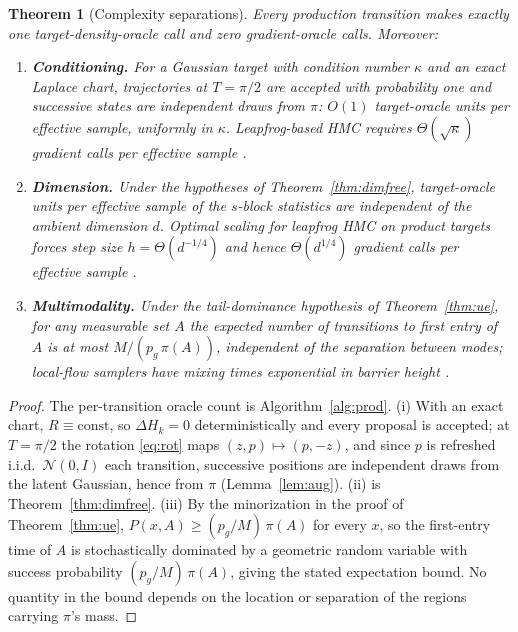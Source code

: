 \documentclass[11pt]{article}
\newtheorem{theorem}{Theorem}
\theoremstyle{remark}
\begin{document}
\begin{theorem}[Complexity separations]\label{thm:sep}
Every production transition makes exactly one target-density-oracle call
and zero gradient-oracle calls. Moreover:
\begin{enumerate}
\item[(i)] \textbf{Conditioning.} For a Gaussian target with condition
  number $\kappa$ and an exact Laplace chart, trajectories at $T=\pi/2$
  are accepted with probability one and successive states are
  independent draws from $\pi$: $O(1)$ target-oracle units per effective
  sample, uniformly in $\kappa$. Leapfrog-based HMC requires
  $\Theta(\sqrt\kappa)$ gradient calls per effective sample
  \citep{neal2011,langmore2019}.
\item[(ii)] \textbf{Dimension.} Under the hypotheses of
  Theorem~\ref{thm:dimfree}, target-oracle units per effective sample of
  the $s$-block statistics are independent of the ambient dimension $d$.
  Optimal scaling for leapfrog HMC on product targets forces step size
  $h=\Theta(d^{-1/4})$ and hence $\Theta(d^{1/4})$ gradient calls per
  effective sample \citep{beskos2013}.
\item[(iii)] \textbf{Multimodality.} Under the tail-dominance hypothesis
  of Theorem~\ref{thm:ue}, for any measurable set $A$ the expected
  number of transitions to first entry of $A$ is at most
  $M/(p_g\,\pi(A))$, \emph{independent of the separation between modes};
  local-flow samplers have mixing times exponential in barrier height
  \citep{mangoubi2018}.
\end{enumerate}
\end{theorem}
\begin{proof}
The per-transition oracle count is Algorithm~\ref{alg:prod}. (i) With an
exact chart, $R\equiv\mathrm{const}$, so $\Delta H_k=0$ deterministically
and every proposal is accepted; at $T=\pi/2$ the rotation
\eqref{eq:rot} maps $(z,p)\mapsto(p,-z)$, and since $p$ is refreshed
i.i.d.\ $\mathcal N(0,I)$ each transition, successive positions are
independent draws from the latent Gaussian, hence from $\pi$
(Lemma~\ref{lem:aug}). (ii) is Theorem~\ref{thm:dimfree}. (iii) By the
minorization in the proof of Theorem~\ref{thm:ue},
$P(x,A)\ge(p_g/M)\,\pi(A)$ for every $x$, so the first-entry time of $A$
is stochastically dominated by a geometric random variable with success
probability $(p_g/M)\,\pi(A)$, giving the stated expectation bound. No
quantity in the bound depends on the location or separation of the
regions carrying $\pi$'s mass.
\end{proof}
\end{document}

